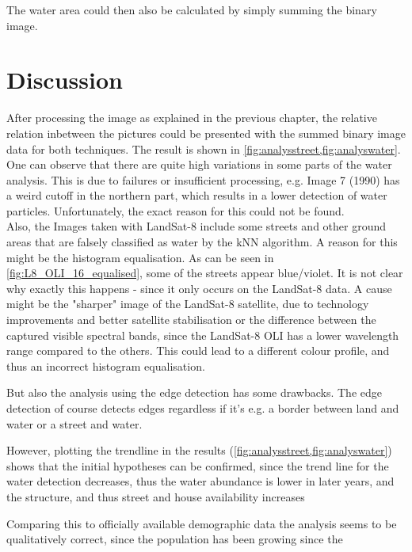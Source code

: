 The water area could then also be calculated by simply summing the binary image.

\section{Discussion}
After processing the image as explained in the previous chapter, the relative relation inbetween the pictures could be presented with the summed binary image data for both techniques. The result is shown in \cref{fig:analysstreet,fig:analyswater}. \\
One can observe that there are quite high variations in some parts of the water analysis. This is due to failures or insufficient processing, e.g. Image 7 (1990) has a weird cutoff in the northern part, which results in a lower detection of water particles. Unfortunately, the exact reason for this could not be found.\\
Also, the Images taken with LandSat-8 include some streets and other ground areas that are falsely classified as water by the kNN algorithm. A reason for this might be the histogram equalisation. As can be seen in \cref{fig:L8_OLI_16_equalised}, some of the streets appear blue/violet. It is not clear why exactly this happens - since it only occurs on the LandSat-8 data. A cause might be the "sharper" image of the LandSat-8 satellite, due to technology improvements and better satellite stabilisation or the difference between the captured visible spectral bands, since the LandSat-8 OLI has a lower wavelength range compared to the others. This could lead to a different colour profile, and thus an incorrect histogram equalisation.

But also the analysis using the edge detection has some drawbacks.
The edge detection of course detects edges regardless if it's e.g. a border between land and water or a street and water.

However, plotting the trendline in the results (\cref{fig:analysstreet,fig:analyswater}) shows that the initial hypotheses can be confirmed, since the trend line for the water detection decreases, thus the water abundance is lower in later years, and the structure, and thus street and house availability increases

Comparing this to officially available demographic data the analysis seems to be qualitatively correct, since the population has been growing since the 

